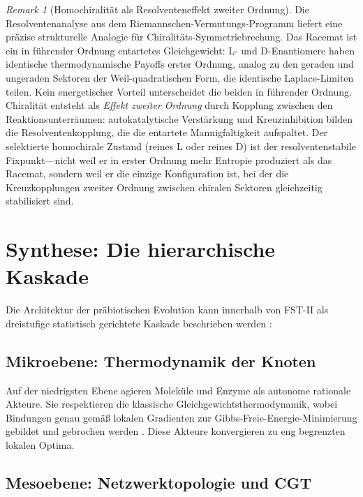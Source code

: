 \documentclass[12pt,a4paper]{article}
\theoremstyle{remark}
\newtheorem{remark}{Remark}
\begin{document}
\begin{remark}[Homochiralit\"at als Resolventeneffekt zweiter Ordnung]
\label{rem:chirality-resolvent}
Die Resolventenanalyse aus dem Riemannschen-Vermutungs-Programm \citep{GeigerRH2026b} liefert eine pr\"azise strukturelle Analogie f\"ur Chiralit\"ats-Symmetriebrechung. Das Racemat ist ein in f\"uhrender Ordnung entartetes Gleichgewicht: L- und D-Enantiomere haben identische thermodynamische Payoffs erster Ordnung, analog zu den geraden und ungeraden Sektoren der Weil-quadratischen Form, die identische Laplace-Limiten teilen. Kein energetischer Vorteil unterscheidet die beiden in f\"uhrender Ordnung. Chiralit\"at entsteht als \emph{Effekt zweiter Ordnung} durch Kopplung zwischen den Reaktionsunterr\"aumen: autokatalytische Verst\"arkung und Kreuzinhibition bilden die Resolventenkopplung, die die entartete Mannigfaltigkeit aufspaltet. Der selektierte homochirale Zustand (reines L oder reines D) ist der resolventenstabile Fixpunkt---nicht weil er in erster Ordnung mehr Entropie produziert als das Racemat, sondern weil er die einzige Konfiguration ist, bei der die Kreuzkopplungen zweiter Ordnung zwischen chiralen Sektoren gleichzeitig stabilisiert sind.
\end{remark}

\section{Synthese: Die hierarchische Kaskade}
\label{sec:synthesis}

Die Architektur der pr\"abiotischen Evolution kann innerhalb von FST-II als dreistufige statistisch gerichtete Kaskade beschrieben werden \citep{ThermodynamicsLife}:

\subsection{Mikroebene: Thermodynamik der Knoten}

Auf der niedrigsten Ebene agieren Molek\"ule und Enzyme als autonome rationale Akteure. Sie respektieren die klassische Gleichgewichtsthermodynamik, wobei Bindungen genau gem\"a\ss{} lokalen Gradienten zur Gibbs-Freie-Energie-Minimierung gebildet und gebrochen werden \citep{MetabolicNash}. Diese Akteure konvergieren zu eng begrenzten lokalen Optima.

\subsection{Mesoebene: Netzwerktopologie und CGT}
\end{document}
